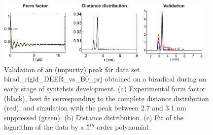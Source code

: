 \documentclass[11pt,a4paper]{article}
\begin{document}
\begin{figure}[ht]
 \vspace{10mm}
 	\begin{center}
		\includegraphics[width=0.95\textwidth]{figure15.pdf}
	\end{center}
	\caption{Validation of an (impurity) peak for data set {\ttfamily birad\_rigid\_DEER\_vs\_B0\_prj} obtained on a biradical during an early stage of syntehsis development.  (a) Experimental form factor (black), best fit corresponding to the complete distance distribution (red), and simulation with the peak between 2.7 and 3.1 nm suppressed (green). (b) Distance distribution. (c) Fit of the logarithm of the data by a 5$^{th}$ order polynomial.}
	\label{fig:15}
\end{figure}
\end{document}
